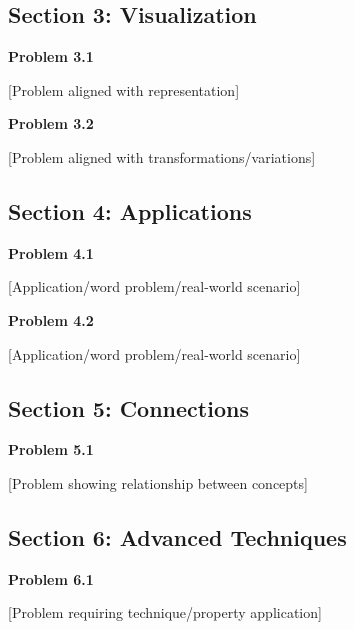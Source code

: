\documentclass[12pt,letterpaper]{article}
\begin{document}
\subsection{Section 3: Visualization}

\textbf{Problem 3.1}

[Problem aligned with representation]

\vspace{12pt}

\textbf{Problem 3.2}

[Problem aligned with transformations/variations]

\vspace{12pt}


\subsection{Section 4: Applications}

\textbf{Problem 4.1}

[Application/word problem/real-world scenario]

\vspace{12pt}

\textbf{Problem 4.2}

[Application/word problem/real-world scenario]

\vspace{12pt}


\subsection{Section 5: Connections}

\textbf{Problem 5.1}

[Problem showing relationship between concepts]

\vspace{12pt}


\subsection{Section 6: Advanced Techniques}

\textbf{Problem 6.1}

[Problem requiring technique/property application]
\end{document}
